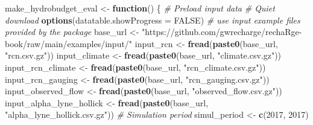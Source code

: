 \documentclass[
]{book}
\newenvironment{Shaded}{\begin{snugshade}}{\end{snugshade}}
\newcommand{\AttributeTok}[1]{\textcolor[rgb]{0.13,0.29,0.53}{#1}}
\newcommand{\CommentTok}[1]{\textcolor[rgb]{0.56,0.35,0.01}{\textit{#1}}}
\newcommand{\ConstantTok}[1]{\textcolor[rgb]{0.56,0.35,0.01}{#1}}
\newcommand{\ControlFlowTok}[1]{\textcolor[rgb]{0.13,0.29,0.53}{\textbf{#1}}}
\newcommand{\DecValTok}[1]{\textcolor[rgb]{0.00,0.00,0.81}{#1}}
\newcommand{\FunctionTok}[1]{\textcolor[rgb]{0.13,0.29,0.53}{\textbf{#1}}}
\newcommand{\NormalTok}[1]{#1}
\newcommand{\OtherTok}[1]{\textcolor[rgb]{0.56,0.35,0.01}{#1}}
\newcommand{\StringTok}[1]{\textcolor[rgb]{0.31,0.60,0.02}{#1}}
\begin{document}
\begin{Shaded}
\begin{Highlighting}[]
\NormalTok{make\_hydrobudget\_eval }\OtherTok{\textless{}{-}} \ControlFlowTok{function}\NormalTok{() \{}
  \CommentTok{\# Preload input data}
  \CommentTok{\# Quiet download}
  \FunctionTok{options}\NormalTok{(}\AttributeTok{datatable.showProgress =} \ConstantTok{FALSE}\NormalTok{)}
  \CommentTok{\# use input example files provided by the package}
\NormalTok{  base\_url }\OtherTok{\textless{}{-}} \StringTok{"https://github.com/gwrecharge/rechaRge{-}book/raw/main/examples/input/"}
\NormalTok{  input\_rcn }\OtherTok{\textless{}{-}} \FunctionTok{fread}\NormalTok{(}\FunctionTok{paste0}\NormalTok{(base\_url, }\StringTok{"rcn.csv.gz"}\NormalTok{))}
\NormalTok{  input\_climate }\OtherTok{\textless{}{-}} \FunctionTok{fread}\NormalTok{(}\FunctionTok{paste0}\NormalTok{(base\_url, }\StringTok{"climate.csv.gz"}\NormalTok{))}
\NormalTok{  input\_rcn\_climate }\OtherTok{\textless{}{-}} \FunctionTok{fread}\NormalTok{(}\FunctionTok{paste0}\NormalTok{(base\_url, }\StringTok{"rcn\_climate.csv.gz"}\NormalTok{))}
\NormalTok{  input\_rcn\_gauging }\OtherTok{\textless{}{-}} \FunctionTok{fread}\NormalTok{(}\FunctionTok{paste0}\NormalTok{(base\_url, }\StringTok{"rcn\_gauging.csv.gz"}\NormalTok{))}
\NormalTok{  input\_observed\_flow }\OtherTok{\textless{}{-}} \FunctionTok{fread}\NormalTok{(}\FunctionTok{paste0}\NormalTok{(base\_url, }\StringTok{"observed\_flow.csv.gz"}\NormalTok{))}
\NormalTok{  input\_alpha\_lyne\_hollick }\OtherTok{\textless{}{-}} \FunctionTok{fread}\NormalTok{(}\FunctionTok{paste0}\NormalTok{(base\_url, }\StringTok{"alpha\_lyne\_hollick.csv.gz"}\NormalTok{))}
  \CommentTok{\# Simulation period}
\NormalTok{  simul\_period }\OtherTok{\textless{}{-}} \FunctionTok{c}\NormalTok{(}\DecValTok{2017}\NormalTok{, }\DecValTok{2017}\NormalTok{)}


\end{Highlighting}
\end{Shaded}
\end{document}
